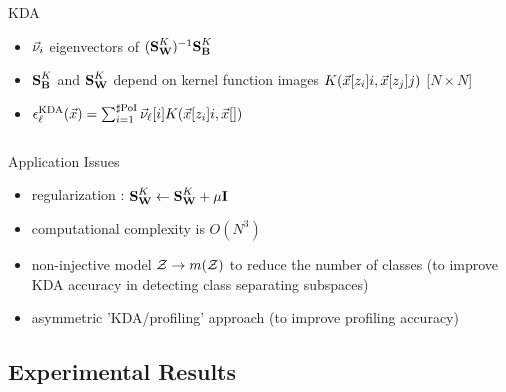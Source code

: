 \begin{frame}
\begin{columns}
\begin{column}{.5\textwidth}
\begin{block}{KDA}
\begin{itemize}
\item $\vec{\nu}_i$ eigenvectors of $(\textbf{S}_{\textbf{W}}^K)^{-1}\textbf{S}_{\textbf{B}}^K$
\item $\textbf{S}_{\textbf{B}}^K$ and $\textbf{S}_{\textbf{W}}^K$ depend on kernel function images $K(\vec{x}[z_i]{i}, \vec{x}[z_j]{j})$ [$N\times N$]
\item $\epsilon^{\mathrm{KDA}}_{\ell}(\vec{x}) = \sum_{i=1}^{\sharp\mathrm{PoI}}\vec{\nu}_\ell[i]K(\vec{x}[z_i]{i}, \vec{x}[]{}) $
\end{itemize}
\end{block}
\end{column}
\end{columns}
\vspace{-5pt}
\begin{block}{Application Issues}
\begin{itemize}
\item regularization : $\textbf{S}_{\textbf{W}}^K \leftarrow \textbf{S}_{\textbf{W}}^K + \mu \textbf{I}$
\item computational complexity is $O(N^3)$ 
\item non-injective model $\mathcal{Z} \rightarrow m(\mathcal{Z})$ to reduce the number of classes (to improve KDA accuracy in detecting class separating subspaces)
\item asymmetric 'KDA/profiling' approach (to improve profiling accuracy)
\end{itemize}
\end{block}

\end{frame}

\subsection{Experimental Results}


